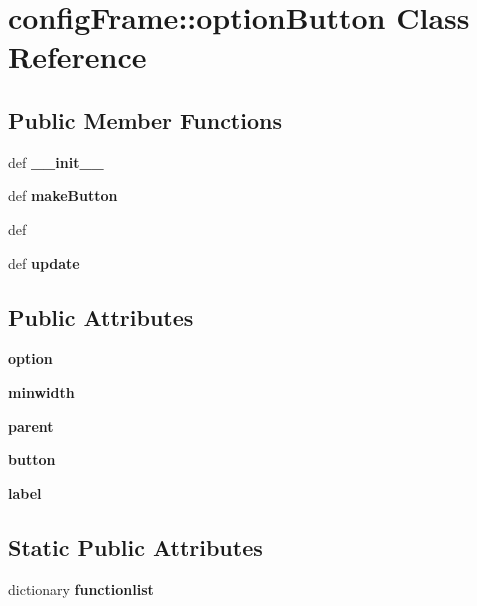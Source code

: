 \section{config\-Frame::option\-Button Class Reference}
\label{classconfigFrame_1_1optionButton}
\subsection*{Public Member Functions}
\begin{CompactItemize}
\item 
def \textbf{\_\-\_\-init\_\-\_\-}\label{classconfigFrame_1_1optionButton_aa81a40d3a635f23e11303da61ecda91}

\item 
def \textbf{make\-Button}\label{classconfigFrame_1_1optionButton_010a602824028a24146a99dd3c2221bd}

\item 
def {\bfedit}
\item 
def \textbf{update}\label{classconfigFrame_1_1optionButton_e498babb26b45d8324978e30d4574464}

\end{CompactItemize}
\subsection*{Public Attributes}
\begin{CompactItemize}
\item 
\textbf{option}\label{classconfigFrame_1_1optionButton_d34719148a0f8fa3c67bb2fa3b72d27a}

\item 
\textbf{minwidth}\label{classconfigFrame_1_1optionButton_8a8b2d39f9c552880320567537bb85d1}

\item 
\textbf{parent}\label{classconfigFrame_1_1optionButton_ed78c060696f5e853c9863b69a419dd8}

\item 
\textbf{button}\label{classconfigFrame_1_1optionButton_1fc70fda6e74b02be75cb05400f8a84e}

\item 
\textbf{label}\label{classconfigFrame_1_1optionButton_f527a5b0b45594cb0b2e323d60c391d7}

\end{CompactItemize}
\subsection*{Static Public Attributes}
\begin{CompactItemize}
\item 
dictionary \textbf{functionlist}
\end{CompactItemize}


